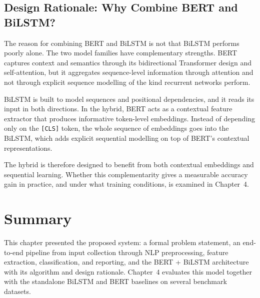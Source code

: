 \subsection{Design Rationale: Why Combine BERT and BiLSTM?}

The reason for combining BERT and BiLSTM is not that BiLSTM performs poorly alone. The two model families have complementary strengths. BERT captures context and semantics through its bidirectional Transformer design and self-attention, but it aggregates sequence-level information through attention and not through explicit sequence modelling of the kind recurrent networks perform.

BiLSTM is built to model sequences and positional dependencies, and it reads its input in both directions. In the hybrid, BERT acts as a contextual feature extractor that produces informative token-level embeddings. Instead of depending only on the \texttt{[CLS]} token, the whole sequence of embeddings goes into the BiLSTM, which adds explicit sequential modelling on top of BERT's contextual representations.

The hybrid is therefore designed to benefit from both contextual embeddings and sequential learning. Whether this complementarity gives a measurable accuracy gain in practice, and under what training conditions, is examined in Chapter~4.

\section{Summary}

This chapter presented the proposed system: a formal problem statement, an end-to-end pipeline from input collection through NLP preprocessing, feature extraction, classification, and reporting, and the BERT + BiLSTM architecture with its algorithm and design rationale. Chapter~4 evaluates this model together with the standalone BiLSTM and BERT baselines on several benchmark datasets.
